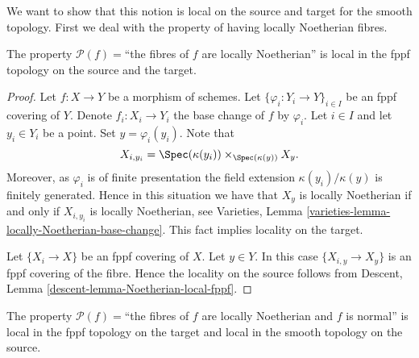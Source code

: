 \noindent
We want to show that this notion is local on the source and target
for the smooth topology. First we deal with the property of having
locally Noetherian fibres.

\begin{lemma}
\label{lemma-locally-Noetherian-fibres-fppf-local-source-and-target}
The property $\mathcal{P}(f)=$``the fibres of $f$ are locally Noetherian''
is local in the fppf topology on the source and the target.
\end{lemma}

\begin{proof}
Let $f : X \to Y$ be a morphism of schemes.
Let $\{\varphi_i : Y_i \to Y\}_{i \in I}$ be an fppf covering of $Y$.
Denote $f_i : X_i \to Y_i$ the base change of $f$ by $\varphi_i$.
Let $i \in I$ and let $y_i \in Y_i$ be a point.
Set $y = \varphi_i(y_i)$. Note that
$$
X_{i, y_i} = \Spec(\kappa(y_i)) \times_{\Spec(\kappa(y))} X_y.
$$
Moreover, as $\varphi_i$ is of finite presentation the field extension
$\kappa(y_i)/\kappa(y)$ is finitely generated.
Hence in this situation we have that $X_y$ is locally Noetherian if and
only if $X_{i, y_i}$ is locally Noetherian, see
Varieties, Lemma \ref{varieties-lemma-locally-Noetherian-base-change}.
This fact implies locality on the target.

\medskip\noindent
Let $\{X_i \to X\}$ be an fppf covering of $X$.
Let $y \in Y$. In this case $\{X_{i, y} \to X_y\}$ is an
fppf covering of the fibre. Hence the locality on the source
follows from Descent, Lemma \ref{descent-lemma-Noetherian-local-fppf}.
\end{proof}

\begin{lemma}
\label{lemma-normal-fppf-local-source-and-target}
The property
$\mathcal{P}(f)=$``the fibres of $f$ are locally Noetherian and $f$ is normal''
is local in the fppf topology on the target and
local in the smooth topology on the source.
\end{lemma}

